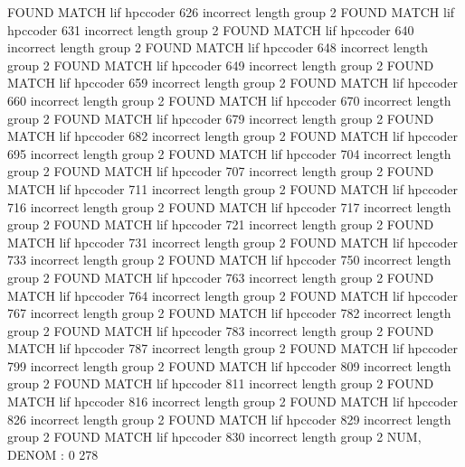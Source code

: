 FOUND MATCH lif hpccoder 626 incorrect
length group  2
FOUND MATCH lif hpccoder 631 incorrect
length group  2
FOUND MATCH lif hpccoder 640 incorrect
length group  2
FOUND MATCH lif hpccoder 648 incorrect
length group  2
FOUND MATCH lif hpccoder 649 incorrect
length group  2
FOUND MATCH lif hpccoder 659 incorrect
length group  2
FOUND MATCH lif hpccoder 660 incorrect
length group  2
FOUND MATCH lif hpccoder 670 incorrect
length group  2
FOUND MATCH lif hpccoder 679 incorrect
length group  2
FOUND MATCH lif hpccoder 682 incorrect
length group  2
FOUND MATCH lif hpccoder 695 incorrect
length group  2
FOUND MATCH lif hpccoder 704 incorrect
length group  2
FOUND MATCH lif hpccoder 707 incorrect
length group  2
FOUND MATCH lif hpccoder 711 incorrect
length group  2
FOUND MATCH lif hpccoder 716 incorrect
length group  2
FOUND MATCH lif hpccoder 717 incorrect
length group  2
FOUND MATCH lif hpccoder 721 incorrect
length group  2
FOUND MATCH lif hpccoder 731 incorrect
length group  2
FOUND MATCH lif hpccoder 733 incorrect
length group  2
FOUND MATCH lif hpccoder 750 incorrect
length group  2
FOUND MATCH lif hpccoder 763 incorrect
length group  2
FOUND MATCH lif hpccoder 764 incorrect
length group  2
FOUND MATCH lif hpccoder 767 incorrect
length group  2
FOUND MATCH lif hpccoder 782 incorrect
length group  2
FOUND MATCH lif hpccoder 783 incorrect
length group  2
FOUND MATCH lif hpccoder 787 incorrect
length group  2
FOUND MATCH lif hpccoder 799 incorrect
length group  2
FOUND MATCH lif hpccoder 809 incorrect
length group  2
FOUND MATCH lif hpccoder 811 incorrect
length group  2
FOUND MATCH lif hpccoder 816 incorrect
length group  2
FOUND MATCH lif hpccoder 826 incorrect
length group  2
FOUND MATCH lif hpccoder 829 incorrect
length group  2
FOUND MATCH lif hpccoder 830 incorrect
length group  2
NUM, DENOM : 0 278
